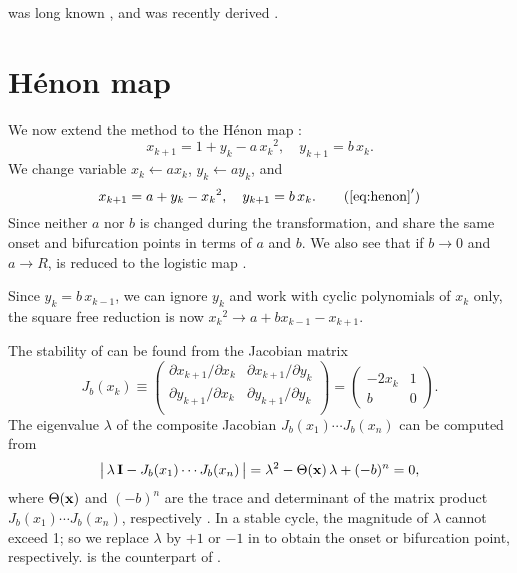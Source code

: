 \documentclass{ws-ijbc}
\begin{document}
 was long known \cite{mira, stephenson2},
and  was recently derived \cite{blackhurst}.




\section{\label{sec:henon}H\'enon map}





We now extend the method to the H\'enon map \cite{henon}:
\begin{equation}
  x_{k+1} = 1 + y_k - a \, {x_k}^2, \quad
  y_{k+1} = b \, x_k.
\label{eq:henon}
\end{equation}
%
We change variable $x_k \leftarrow a x_k$, $y_k \leftarrow a y_k$, and
\begin{equation}
  x_{k+1} = a + y_k - {x_k}^2, \quad
  y_{k+1} = b \, x_k.
\tag{$\ref{eq:henon}'$}
\label{eq:henons}
\end{equation}
%
Since neither $a$ nor $b$ is changed during the transformation,
 and  share the
same onset and bifurcation points
in terms of $a$ and $b$.
%
We also see that if $b \rightarrow 0$ and $a \rightarrow R$,
 is reduced to the logistic map .


Since $y_k = b \, x_{k-1}$, we can ignore $y_k$ and work with
  cyclic polynomials of $x_k$ only,
the square free reduction is now
${x_k}^2 \rightarrow a + b x_{k-1} - x_{k+1}$.



The stability of  can be found from the Jacobian matrix
\[
  J_b(x_k)
  \equiv \left(
    \begin{array}{ccc}
      \partial x_{k+1}/\partial x_k & \partial x_{k+1}/\partial y_k \\
      \partial y_{k+1}/\partial x_k & \partial y_{k+1}/\partial y_k \\
    \end{array}
  \right)
  =
  \left(
    \begin{array}{ccc}
      -2 x_k & 1 \\
      b & 0
    \end{array}
  \right).
\]
The eigenvalue $\lambda$ of the composite Jacobian
$J_b(x_1) \cdots J_b(x_n)$ can be computed from
%
\begin{equation}
\big|\, \lambda \, \mathbf{I} - J_b(x_1) \cdots J_b(x_n) \,\big|
  = \lambda^2 - \Theta(\mathbf{x}) \,\lambda +(-b)^n = 0,
\label{eq:henonder}
\end{equation}
%
where $\Theta(\mathbf{x})$ and $(-b)^n$
are the trace and determinant of
the matrix product $J_b(x_1) \cdots J_b(x_n)$,
respectively \cite{hitzl}.
In a stable cycle, the magnitude of $\lambda$
cannot exceed 1; so we replace $\lambda$ by $+1$ or $-1$
in 
to obtain the onset or bifurcation point, respectively.
 is the counterpart of .
\end{document}
